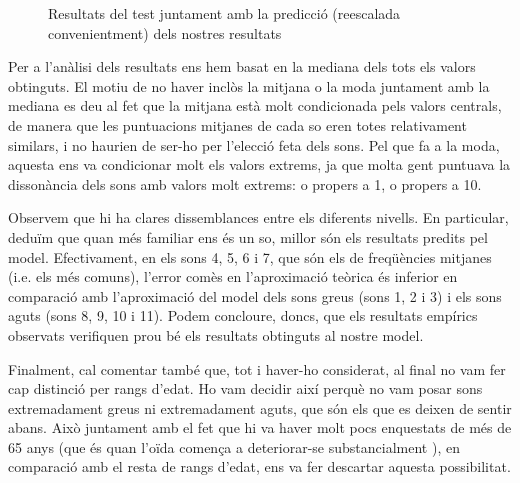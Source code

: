 \documentclass{article}
\theoremstyle{math}
\theoremstyle{TheoremNum}
\newcommand{\0}{\ensuremath{\vb{0}}}
\begin{document}
\begin{figure}[ht]
    \centering
    
    \caption{Resultats del test juntament amb la predicció (reescalada convenientment) dels nostres resultats}
\end{figure}
Per a l'anàlisi dels resultats ens hem basat en la mediana dels tots els valors obtinguts. El motiu de no haver inclòs la mitjana o la moda juntament amb la mediana es deu al fet que la mitjana està molt condicionada pels valors centrals, de manera que les puntuacions mitjanes de cada so eren totes relativament similars, i no haurien de ser-ho per l'elecció feta dels sons. Pel que fa a la moda, aquesta ens va condicionar molt els valors extrems, ja que molta gent puntuava la dissonància dels sons amb valors molt extrems: o propers a 1, o propers a 10.\par
Observem que hi ha clares dissemblances entre els diferents nivells. En particular, deduïm que quan més familiar ens és un so, millor són els resultats predits pel model. Efectivament, en els sons 4, 5, 6 i 7, que són els de freqüències mitjanes (i.e. els més comuns), l'error comès en l'aproximació teòrica és inferior en comparació amb l'aproximació del model dels sons greus (sons 1, 2 i 3) i els sons aguts (sons 8, 9, 10 i 11). Podem concloure, doncs, que els resultats empírics observats verifiquen prou bé els resultats obtinguts al nostre model.\par Finalment, cal comentar també que, tot i haver-ho considerat, al final no vam fer cap distinció per rangs d'edat. Ho vam decidir així perquè no vam posar sons extremadament greus ni extremadament aguts, que són els que es deixen de sentir abans. Això juntament amb el fet que hi va haver molt pocs enquestats de més de 65 anys (que és quan l'oïda comença a deteriorar-se substancialment \cite{age_hearing}), en comparació amb el resta de rangs d'edat, ens va fer descartar aquesta possibilitat.
\end{document}
